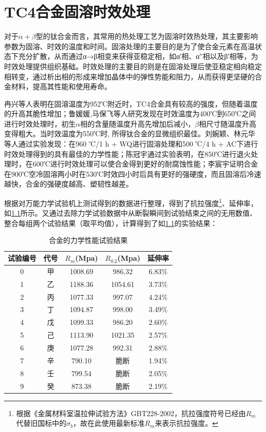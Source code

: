 \chapter{TC4合金固溶时效处理}

对于$\alpha+\beta$型的\ti 钛合金而言，其常用的热处理工艺为固溶时效热处理，其主要影响参数为固溶、时效的温度和时间\cite{mirror1,ranxingGurongwenduduiTi6Al4VELItaihejinxianweizuzhijixingnengdeyingxiang2021}。固溶处理的主要目的是为了使合金元素在高温状态下充分扩散，从而通过α→β相变来获得亚稳定相，如α′相、α′′相以及β′相等，为时效处理提供组织基础。时效处理的主要目的则是在固溶处理后使亚稳定相向稳定相转变，通过析出相的形成来增加晶体中的弹性势能和阻力，从而获得更坚硬的合金材料，提高其性能和使用寿命。


冉兴等人表明\cite{ranxingGurongwenduduiTi6Al4VELItaihejinxianweizuzhijixingnengdeyingxiang2021}在固溶温度为952℃附近时，TC4合金具有较高的强度，但随着温度的升高其脆性增加；鲁媛媛,马保飞等人研究发现在时效温度为400℃到650℃之间进行时效处理时，初生$ \alpha $相的含量随温度升高先增加后减小，$\beta$相尺寸随温度升高变得粗大。当时效温度为550℃时, 所得钛合金的显微组织最佳\cite{luyuanyuanShixiaochuliduiTC4taihejinweiguanzuzhihelixuexingnengdeyingxiang2019}。刘婉颖、林元华等人通过实验发现：在960 ℃/1 h + WQ进行固溶处理和500 ℃/4 h + AC下进行时效处理得到的\ti 具有最佳的力学性能\cite{LiuWanYingBuTongReChuLiGongYiDuiTi6Al4VTaiHeJinWeiGuanJieGouHeLiXueXingNengYingXiangYingWen2017}；陈冠宇通过实验表明，在850℃进行退火处理时，在600℃进行时效处理可以使合金得到更好的耐腐蚀性能\cite{1200}；李宸宇证明\ti 合金在900℃空冷固溶两小时在530℃时效四小时后具有更好的强硬度，而且固溶后冷速越快，合金的强硬度越高、塑韧性越差\cite{900}。%

根据对万能力学试验机上测试得到的数据进行整理，得到了抗拉强度\footnote{根据《金属材料室温拉伸试验方法》GBT228-2002，抗拉强度符号已经由$ R_m $代替旧国标中的$ \sigma_b $，故在此使用最新标准$ R_m $来表示抗拉强度。}、延伸率，如\ref{sec:mystrength}所示。又通过去除力学试验数据中从断裂瞬间到试验结束之间的无用数值、整合每组两个试验结果（取平均值），计算得到了如\ref{sec:mystrength}的实验结果：
\begin{table}[htbp]
	\centering
	\caption{\ti 合金的力学性能试验结果}
	\label{sec:mystrength}
	\begin{tabular}{ccccc}
		\toprule
		试验编号& 代号&$ R_m $(Mpa)&$ R_0.2 $(Mpa)&延伸率 \\
		\midrule
		0 & 甲 & 1008.69 &986.32& 6.83$\%$ \\
		1 & 乙 & 1188.36 &1054.61 &3.73$\%$ \\
		2 & 丙 & 1077.33 & 997.07&4.24$\%$ \\
		3 & 丁 & 1094.87 & 998.00&3.49$\%$ \\
		4 & 戊 & 1099.33 &986.20 &2.60$\%$ \\
		5 & 己 & 1113.90 & 1021.35&2.57$\%$ \\
		6 & 庚 & 1077.28 &992.31& 2.88$\%$ \\
		7 & 辛 & 790.10 & 脆断&1.94$\%$ \\
		8 & 壬 & 799.54 &脆断& 2.05$\%$ \\
		9 & 癸 & 873.38 & 脆断&2.19$\%$ \\
		\bottomrule
	\end{tabular}
\end{table}

